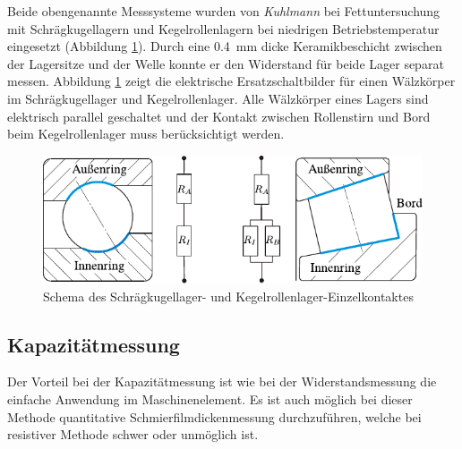 Beide obengenannte Messsysteme wurden von \textit{Kuhlmann} bei Fettuntersuchung mit Schrägkugellagern und Kegelrollenlagern bei niedrigen Betriebstemperatur eingesetzt (Abbildung \ref{fig:schema_schraerikula_kerola_kuhlmann}).
Durch eine \SI{0.4}{\milli\meter} dicke Keramikbeschicht zwischen der Lagersitze und der Welle konnte er den Widerstand für beide Lager separat messen.
Abbildung \ref{fig:schema_schraerikula_kerola_kuhlmann} zeigt die elektrische Ersatzschaltbilder für einen Wälzkörper im Schrägkugellager und Kegelrollenlager.
Alle Wälzkörper eines Lagers sind elektrisch parallel geschaltet und der Kontakt zwischen Rollenstirn und Bord beim Kegelrollenlager muss berücksichtigt werden.
\begin{figure}[htb]
    \centering
    \includegraphics[]{./images/schema_schraegrikula_kerola_kuhlmann.pdf}
    \caption{Schema des Schrägkugellager- und Kegelrollenlager-Einzelkontaktes \cite{kuhlmann_2009}}
    \label{fig:schema_schraerikula_kerola_kuhlmann}
\end{figure}
%

\subsection{Kapazitätmessung}
\label{sub:kapazitatmessung}

Der Vorteil bei der Kapazitätmessung ist wie bei der Widerstandsmessung die einfache Anwendung im Maschinenelement.
Es ist auch möglich bei dieser Methode quantitative Schmierfilmdickenmessung durchzuführen, welche bei resistiver Methode schwer oder unmöglich ist.

